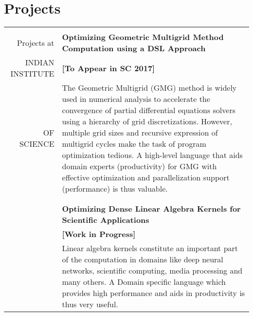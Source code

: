 \documentclass[a4paper,10pt]{article} %
\begin{document}
\section{Projects}
\begin{tabular}{rp{13cm}}
&\\
Projects at & \textbf{Optimizing Geometric Multigrid Method Computation using a DSL Approach} \\
INDIAN INSTITUTE & \hspace{25em} \textbf{[To Appear in SC 2017]} \\
OF SCIENCE 
& \setlength{\leftskip}{0.4cm}
The Geometric Multigrid (GMG) method is widely used in numerical analysis to accelerate the convergence of partial differential equations solvers using
a hierarchy of grid discretizations. However, multiple grid sizes and recursive 
expression of multigrid cycles make the task of program optimization tedious.
A high-level language that aids domain experts (productivity) for GMG with
effective optimization and parallelization support (performance) is thus valuable.\\
& \\
& \\
& \textbf{Optimizing Dense Linear Algebra Kernels for Scientific Applications} \\
& \hspace{25em} \textbf{[Work in Progress]}\\
& \setlength{\leftskip}{0.4cm}
Linear algebra kernels constitute an important part of the computation in domains like deep neural networks, scientific computing, media processing and many others. A Domain specific language which provides high performance and aids in productivity is thus very useful.\\
\end{tabular}
\end{document}
